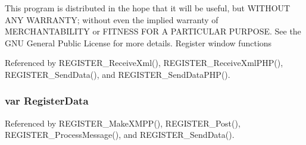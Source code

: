 This program is distributed in the hope that it will be useful, but WITHOUT ANY WARRANTY; without even the implied warranty of MERCHANTABILITY or FITNESS FOR A PARTICULAR PURPOSE. See the GNU General Public License for more details. Register window functions 

Referenced by REGISTER\_\-ReceiveXml(), REGISTER\_\-ReceiveXmlPHP(), REGISTER\_\-SendData(), and REGISTER\_\-SendDataPHP().
\subsubsection{\setlength{\rightskip}{0pt plus 5cm}var {\bf RegisterData}}\label{register_8js_4583a8d58cbb1b7308bdb36dc1ec5b56}




Referenced by REGISTER\_\-MakeXMPP(), REGISTER\_\-Post(), REGISTER\_\-ProcessMessage(), and REGISTER\_\-SendData().